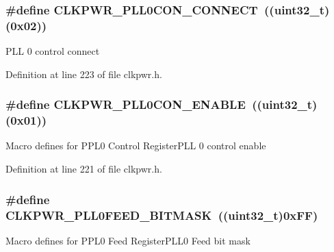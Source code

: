 \subsubsection[{\texorpdfstring{C\+L\+K\+P\+W\+R\+\_\+\+P\+L\+L0\+C\+O\+N\+\_\+\+C\+O\+N\+N\+E\+CT}{CLKPWR_PLL0CON_CONNECT}}]{\setlength{\rightskip}{0pt plus 5cm}\#define C\+L\+K\+P\+W\+R\+\_\+\+P\+L\+L0\+C\+O\+N\+\_\+\+C\+O\+N\+N\+E\+CT~(({\bf uint32\+\_\+t})(0x02))}\hypertarget{group___c_l_k_p_w_r___private___macros_ga3065f59de6fe4a98ca1d5b32388bc4aa}{}\label{group___c_l_k_p_w_r___private___macros_ga3065f59de6fe4a98ca1d5b32388bc4aa}
P\+LL 0 control connect 

Definition at line 223 of file clkpwr.\+h.

\subsubsection[{\texorpdfstring{C\+L\+K\+P\+W\+R\+\_\+\+P\+L\+L0\+C\+O\+N\+\_\+\+E\+N\+A\+B\+LE}{CLKPWR_PLL0CON_ENABLE}}]{\setlength{\rightskip}{0pt plus 5cm}\#define C\+L\+K\+P\+W\+R\+\_\+\+P\+L\+L0\+C\+O\+N\+\_\+\+E\+N\+A\+B\+LE~(({\bf uint32\+\_\+t})(0x01))}\hypertarget{group___c_l_k_p_w_r___private___macros_ga1906f68fbb1a9849dd95762b58f68daa}{}\label{group___c_l_k_p_w_r___private___macros_ga1906f68fbb1a9849dd95762b58f68daa}
Macro defines for P\+P\+L0 Control Register\+P\+LL 0 control enable 

Definition at line 221 of file clkpwr.\+h.

\subsubsection[{\texorpdfstring{C\+L\+K\+P\+W\+R\+\_\+\+P\+L\+L0\+F\+E\+E\+D\+\_\+\+B\+I\+T\+M\+A\+SK}{CLKPWR_PLL0FEED_BITMASK}}]{\setlength{\rightskip}{0pt plus 5cm}\#define C\+L\+K\+P\+W\+R\+\_\+\+P\+L\+L0\+F\+E\+E\+D\+\_\+\+B\+I\+T\+M\+A\+SK~(({\bf uint32\+\_\+t})0x\+F\+F)}\hypertarget{group___c_l_k_p_w_r___private___macros_gae775dff1e028d9342f0798e4ffc3c490}{}\label{group___c_l_k_p_w_r___private___macros_gae775dff1e028d9342f0798e4ffc3c490}
Macro defines for P\+P\+L0 Feed Register\+P\+L\+L0 Feed bit mask 


